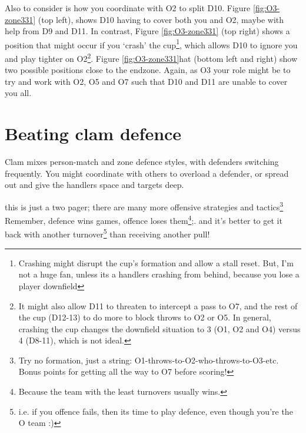 \documentclass{tufte-handout}
\begin{document}
Also to consider
is how you 
coordinate 
with O2 
to split 
D10. 
Figure \ref{fig:O3-zone331}
(top left), 
shows D10 
having to 
cover both 
you and O2, 
maybe with help 
from D9 
and D11. 
In contrast, 
Figure \ref{fig:O3-zone331}
(top right) 
shows a position 
that might occur 
if you `crash' 
the cup\footnote{ 
Crashing 
might  
disrupt the 
cup's formation and 
allow a stall reset.  
But, I'm not a huge fan, 
unless its a handlers 
crashing from behind, 
because you lose 
a player downfield},
which allows
D10 
to ignore you 
and play 
tighter on O2\footnote{ 
It might also allow 
D11 to threaten to intercept 
a pass to O7, 
and the rest of the cup 
(D12-13) 
to do more 
to block throws 
to O2 or O5. 
In general, 
crashing the cup
changes 
the downfield situation 
to 3 (O1, O2 and O4) 
versus 4 (D8-11), 
which is not ideal.}. 
Figure \ref{fig:O3-zone331}hat
(bottom left and right)
show two possible 
positions close to the 
endzone. 
Again, as O3
your role might 
be to try 
and work with 
O2, O5 and O7 
such that D10 
and D11 are unable to 
cover you all.   


\section{Beating clam defence}\label{sec:zone}
Clam mixes person-match 
and zone defence styles, 
with defenders 
switching frequently.
You might
coordinate 
with others  
to overload 
a defender, 
or spread out 
and give the handlers 
space 
and targets deep. 

this is just a two pager; 
there are many more 
offensive strategies 
and tactics\footnote{
Try no formation, just a string: O1-throws-to-O2-who-throws-to-O3-etc. Bonus points for getting all the way to O7 before scoring!}
Remember, 
defence wins games, 
offence loses them\footnote{
Because the team with the least turnovers 
usually wins.};.
and it's better to get it back 
with another turnover\footnote{
i.e. if you offence fails, then its time to play defence, even though you're the O team :)}
than receiving another pull!
\end{document}
